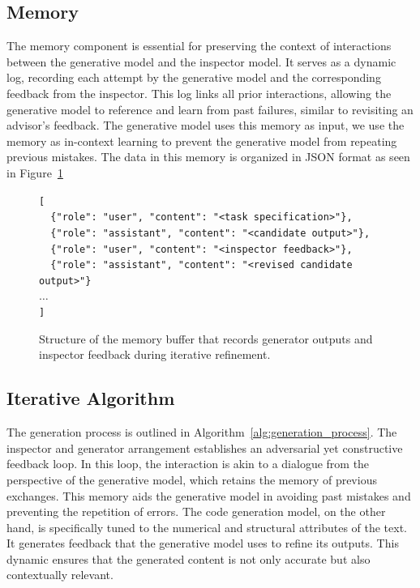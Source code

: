 \documentclass[10pt]{article} %
\begin{document}
    \subsection{Memory}
    \label{sec:memory}
    The memory component is essential for preserving the context of interactions between the generative model and the inspector model. It serves as a dynamic log, recording each attempt by the generative model and the corresponding feedback from the inspector. This log links all prior interactions, allowing the generative model to reference and learn from past failures, similar to revisiting an advisor's feedback. The generative model uses this memory as input, we use the memory as in-context learning to prevent the generative model from repeating previous mistakes. The data in this memory is organized in JSON format as seen in Figure~\ref{fig:memory_structure} %

\begin{figure}[h]
    \begin{minipage}{0.95\linewidth}
    \small
    \texttt{[}\\
    \texttt{\ \ \{"role": "user", "content": "<task specification>"\},}\\
    \texttt{\ \ \{"role": "assistant", "content": "<candidate output>"\},}\\
    \texttt{\ \ \{"role": "user", "content": "<inspector feedback>"\},}\\
    \texttt{\ \ \{"role": "assistant", "content": "<revised candidate output>"\}}\\
    $\dots$\\
    \texttt{]}
    \end{minipage}
\caption{Structure of the memory buffer that records generator outputs and inspector feedback during iterative refinement.}    \label{fig:memory_structure}
\end{figure}


    

    \subsection{Iterative Algorithm}

    The generation process is outlined in Algorithm~\ref{alg:generation_process}. The inspector and generator arrangement establishes an adversarial yet constructive feedback loop. In this loop, the interaction is akin to a dialogue from the perspective of the generative model, which retains the memory of previous exchanges. This memory aids the generative model in avoiding past mistakes and preventing the repetition of errors. The code generation model, on the other hand, is specifically tuned to the numerical and structural attributes of the text. It generates feedback that the generative model uses to refine its outputs. This dynamic ensures that the generated content is not only accurate but also contextually relevant.
\end{document}
